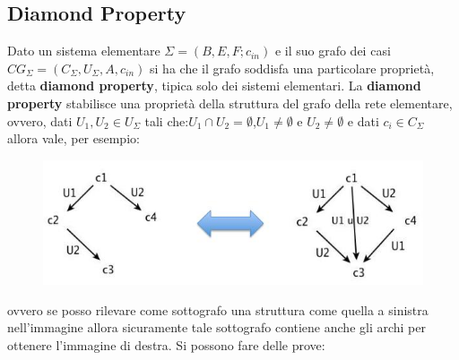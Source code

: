\subsection{Diamond Property}
Dato un sistema elementare $\Sigma = (B,E,F;c_{in})$ e il suo grafo dei casi $CG_\Sigma=(C_\Sigma, U_\Sigma, A, c_{in})$ si ha che il grafo soddisfa una particolare proprietà, detta \textbf{diamond property}, tipica solo dei sistemi elementari.
La \textbf{diamond property} stabilisce una proprietà della struttura del grafo della rete elementare, ovvero, dati $U_1,U_2\in U_\Sigma$ tali che:$U_1\cap U_2=\emptyset$,$U_1\neq\emptyset$ e  $U_2\neq\emptyset$ e dati $c_i\in C_\Sigma$ allora vale, per esempio:
\begin{figure}[H]
    \centering
    \includegraphics[scale = 0.6]{IMM/diamond.jpg}
    \label{fig:dia}
\end{figure}
ovvero se posso rilevare come sottografo una struttura come quella a sinistra nell'immagine allora sicuramente tale sottografo contiene anche gli archi per ottenere l'immagine di destra. Si possono fare delle prove:
